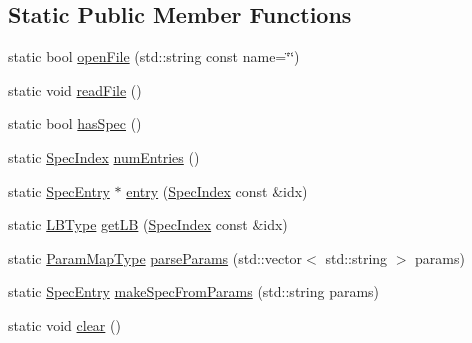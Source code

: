 \subsection*{Static Public Member Functions}
\begin{DoxyCompactItemize}
\item 
static bool \hyperlink{structvt_1_1vrt_1_1collection_1_1balance_1_1_read_l_b_spec_a17dc2fc7785cd6519440c080a472af05}{open\+File} (std\+::string const name=\char`\"{}\char`\"{})
\item 
static void \hyperlink{structvt_1_1vrt_1_1collection_1_1balance_1_1_read_l_b_spec_a4a6d3bd1ef9a432a33518d42c92d9e9b}{read\+File} ()
\item 
static bool \hyperlink{structvt_1_1vrt_1_1collection_1_1balance_1_1_read_l_b_spec_a38f65064cd81275eb9c9d596d0f0a35f}{has\+Spec} ()
\item 
static \hyperlink{namespacevt_1_1vrt_1_1collection_1_1balance_a72a5e0d9936ddf57f8e6c64e0e9fd123}{Spec\+Index} \hyperlink{structvt_1_1vrt_1_1collection_1_1balance_1_1_read_l_b_spec_ab7a988ed27206ee728474ad200c47291}{num\+Entries} ()
\item 
static \hyperlink{structvt_1_1vrt_1_1collection_1_1balance_1_1_spec_entry}{Spec\+Entry} $\ast$ \hyperlink{structvt_1_1vrt_1_1collection_1_1balance_1_1_read_l_b_spec_af9e1e7f7ea03e6a7bc06d38c2ca28544}{entry} (\hyperlink{namespacevt_1_1vrt_1_1collection_1_1balance_a72a5e0d9936ddf57f8e6c64e0e9fd123}{Spec\+Index} const \&idx)
\item 
static \hyperlink{namespacevt_1_1vrt_1_1collection_1_1balance_ac4f99693509affcc67db182d4aad9b5c}{L\+B\+Type} \hyperlink{structvt_1_1vrt_1_1collection_1_1balance_1_1_read_l_b_spec_a55d8e971ad0821c272aeb3c20455c389}{get\+LB} (\hyperlink{namespacevt_1_1vrt_1_1collection_1_1balance_a72a5e0d9936ddf57f8e6c64e0e9fd123}{Spec\+Index} const \&idx)
\item 
static \hyperlink{structvt_1_1vrt_1_1collection_1_1balance_1_1_read_l_b_spec_a01c2aa3a9e92be646c37f24afda6afa2}{Param\+Map\+Type} \hyperlink{structvt_1_1vrt_1_1collection_1_1balance_1_1_read_l_b_spec_a69993cae4576e25d70929e95dad81d7e}{parse\+Params} (std\+::vector$<$ std\+::string $>$ params)
\item 
static \hyperlink{structvt_1_1vrt_1_1collection_1_1balance_1_1_spec_entry}{Spec\+Entry} \hyperlink{structvt_1_1vrt_1_1collection_1_1balance_1_1_read_l_b_spec_a4a3fc33794511c6d74d6e4a70eb72682}{make\+Spec\+From\+Params} (std\+::string params)
\item 
static void \hyperlink{structvt_1_1vrt_1_1collection_1_1balance_1_1_read_l_b_spec_aa92db6434f6eb0839312f914139d296c}{clear} ()
\end{DoxyCompactItemize}


